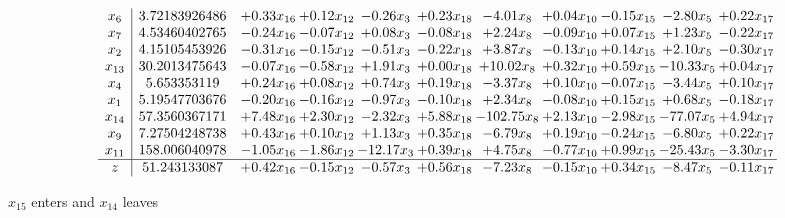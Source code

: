 \documentclass[9pt]{article}
\begin{document}
 \[\begin{array}{c| c c@{\hskip 2pt} c@{\hskip 2pt} c@{\hskip 2pt} c@{\hskip 2pt} c@{\hskip 2pt} c@{\hskip 2pt} c@{\hskip 2pt} c@{\hskip 2pt} c@{\hskip 2pt} }
 x_{6}   &  3.72183926486 & +  0.33 x_{16} & +  0.12 x_{12} & -0.26 x_{3} & +  0.23 x_{18} & -4.01 x_{8} & +  0.04 x_{10} & -0.15 x_{15} & -2.80 x_{5} & +  0.22 x_{17}\\
 x_{7}   &  4.53460402765 & -0.24 x_{16} & -0.07 x_{12} & +  0.08 x_{3} & -0.08 x_{18} & +  2.24 x_{8} & -0.09 x_{10} & +  0.07 x_{15} & +  1.23 x_{5} & -0.22 x_{17}\\
 x_{2}   &  4.15105453926 & -0.31 x_{16} & -0.15 x_{12} & -0.51 x_{3} & -0.22 x_{18} & +  3.87 x_{8} & -0.13 x_{10} & +  0.14 x_{15} & +  2.10 x_{5} & -0.30 x_{17}\\
 x_{13}   &  30.2013475643 & -0.07 x_{16} & -0.58 x_{12} & +  1.91 x_{3} & +  0.00 x_{18} & + 10.02 x_{8} & +  0.32 x_{10} & +  0.59 x_{15} & -10.33 x_{5} & +  0.04 x_{17}\\
 x_{4}   &  5.653353119 & +  0.24 x_{16} & +  0.08 x_{12} & +  0.74 x_{3} & +  0.19 x_{18} & -3.37 x_{8} & +  0.10 x_{10} & -0.07 x_{15} & -3.44 x_{5} & +  0.10 x_{17}\\
 x_{1}   &  5.19547703676 & -0.20 x_{16} & -0.16 x_{12} & -0.97 x_{3} & -0.10 x_{18} & +  2.34 x_{8} & -0.08 x_{10} & +  0.15 x_{15} & +  0.68 x_{5} & -0.18 x_{17}\\
 x_{14}   &  57.3560367171 & +  7.48 x_{16} & +  2.30 x_{12} & -2.32 x_{3} & +  5.88 x_{18} & -102.75 x_{8} & +  2.13 x_{10} & -2.98 x_{15} & -77.07 x_{5} & +  4.94 x_{17}\\
 x_{9}   &  7.27504248738 & +  0.43 x_{16} & +  0.10 x_{12} & +  1.13 x_{3} & +  0.35 x_{18} & -6.79 x_{8} & +  0.19 x_{10} & -0.24 x_{15} & -6.80 x_{5} & +  0.22 x_{17}\\
 x_{11}   &  158.006040978 & -1.05 x_{16} & -1.86 x_{12} & -12.17 x_{3} & +  0.39 x_{18} & +  4.75 x_{8} & -0.77 x_{10} & +  0.99 x_{15} & -25.43 x_{5} & -3.30 x_{17}\\
\hline
z    &  51.243133087 & +  0.42 x_{16} & -0.15 x_{12} & -0.57 x_{3} & +  0.56 x_{18} & -7.23 x_{8} & -0.15 x_{10} & +  0.34 x_{15} & -8.47 x_{5} & -0.11 x_{17}\\
\end{array}\]


 $ x_{15} $ enters and $ x_{14} $ leaves 
\end{document}
